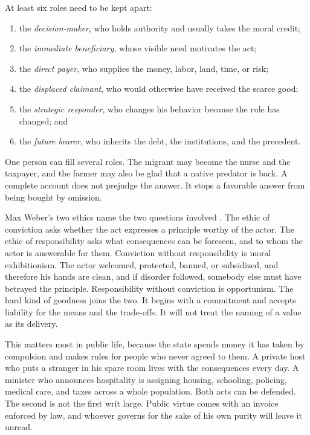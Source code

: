 \documentclass[12pt,a4paper]{book}
\begin{document}
At least six roles need to be kept apart:

\begin{enumerate}
\item the \emph{decision-maker}, who holds authority and usually takes the moral credit;
\item the \emph{immediate beneficiary}, whose visible need motivates the act;
\item the \emph{direct payer}, who supplies the money, labor, land, time, or risk;
\item the \emph{displaced claimant}, who would otherwise have received the scarce good;
\item the \emph{strategic responder}, who changes his behavior because the rule has changed; and
\item the \emph{future bearer}, who inherits the debt, the institutions, and the precedent.
\end{enumerate}

One person can fill several roles. The migrant may become the nurse and the taxpayer, and the farmer may also be glad that a native predator is back. A complete account does not prejudge the answer. It stops a favorable answer from being bought by omission.

Max Weber's two ethics name the two questions involved \cite{Weber1919}. The ethic of conviction asks whether the act expresses a principle worthy of the actor. The ethic of responsibility asks what consequences can be foreseen, and to whom the actor is answerable for them. Conviction without responsibility is moral exhibitionism. The actor welcomed, protected, banned, or subsidized, and therefore his hands are clean, and if disorder followed, somebody else must have betrayed the principle. Responsibility without conviction is opportunism. The hard kind of goodness joins the two. It begins with a commitment and accepts liability for the means and the trade-offs. It will not treat the naming of a value as its delivery.

This matters most in public life, because the state spends money it has taken by compulsion and makes rules for people who never agreed to them. A private host who puts a stranger in his spare room lives with the consequences every day. A minister who announces hospitality is assigning housing, schooling, policing, medical care, and taxes across a whole population. Both acts can be defended. The second is not the first writ large. Public virtue comes with an invoice enforced by law, and whoever governs for the sake of his own purity will leave it unread.
\end{document}
